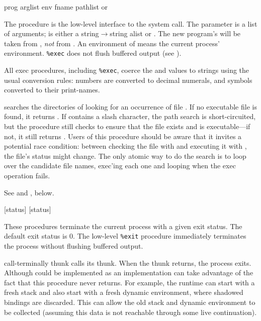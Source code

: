  {prog arglist env} \undefined
{} {fname pathlist} {{\str} or \sharpf}
\begin{desc}
The  procedure is the low-level interface to the system call.
The  parameter is a list of arguments; 
 is either a string$\rightarrow$string alist or {\sharpt}.  
The new program's  will be taken from ,
\emph{not} from .
An environment of {\sharpt} means the current process' environment. 
\verb|%exec| does not flush buffered output
(see ).

All exec procedures, including \verb|%exec|, coerce the  and 
values to strings using the usual conversion rules: numbers are converted to
decimal numerals, and symbols converted to their print-names.

 searches the directories of  looking for
an occurrence of file . If no executable file is found, it returns
{\sharpf}. If  contains a slash character, the path search is
short-circuited, but the procedure still checks to ensure that the file exists
and is executable---if not, it still returns {\sharpf}.
Users of this procedure should be aware that it invites a potential race 
condition: between checking the file with  and executing
it with , the file's status might change.
The only atomic way to do the search is to loop over the candidate
file names, exec'ing each one and looping when the exec operation fails.

See  and , below.%
\end{desc}

 {[status]} \noreturn
{} {[status]} \noreturn
\begin{desc}
These procedures terminate the current process with a given exit status.
The default exit status is 0.
The low-level \verb|%exit| procedure immediately terminates the process
without flushing buffered output.
\end{desc}

\begin{defundesc} {call-terminally} {thunk} \noreturn
     calls its thunk. When the thunk returns, the process
    exits.  Although  could be implemented as
    an implementation can take advantage of the fact that this procedure never
    returns. For example, the runtime can start with a fresh stack and also
    start with a fresh dynamic environment, where shadowed bindings are
    discarded. This can allow the old stack and dynamic environment to be
    collected (assuming this data is not reachable through some live
    continuation).
\end{defundesc}

